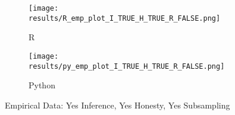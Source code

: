 \documentclass[landscape]{article}
\begin{document}
\begin{figure}
\centering
\begin{subfigure}{.5\textwidth}
  \centering
  \texttt{[image: results/R\_emp\_plot\_I\_TRUE\_H\_TRUE\_R\_FALSE.png]}
  \caption{R}
  \label{fig:sub1}
\end{subfigure}%
\begin{subfigure}{.5\textwidth}
  \centering
  \texttt{[image: results/py\_emp\_plot\_I\_TRUE\_H\_TRUE\_R\_FALSE.png]}
  \caption{Python}
  \label{fig:sub2}
\end{subfigure}
\caption{Empirical Data: Yes Inference, Yes Honesty, Yes Subsampling}
\label{fig:test}
\end{figure}
\end{document}
